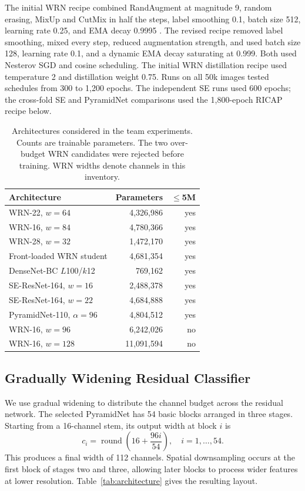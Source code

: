 \documentclass[letterpaper]{article} %
\begin{document}
The initial WRN recipe combined RandAugment at magnitude 9, random erasing, MixUp and CutMix in half the steps, label smoothing 0.1, batch size 512, learning rate 0.25, and EMA decay 0.9995 \cite{cubuk2019randaugment,zhang2018mixup,yun2019cutmix}. The revised recipe removed label smoothing, mixed every step, reduced augmentation strength, and used batch size 128, learning rate 0.1, and a dynamic EMA decay saturating at 0.999. Both used Nesterov SGD and cosine scheduling. The initial WRN distillation recipe used temperature 2 and distillation weight 0.75. Runs on all 50k images tested schedules from 300 to 1,200 epochs. The independent SE runs used 600 epochs; the cross-fold SE and PyramidNet comparisons used the 1,800-epoch RICAP recipe below.

\begin{table}[t]
\centering
\small
\begin{tabular}{lrr}
\toprule
Architecture & Parameters & $\le$5M \\
\midrule
WRN-22, $w{=}64$ & 4{,}326{,}986 & yes \\
WRN-16, $w{=}84$ & 4{,}780{,}366 & yes \\
WRN-28, $w{=}32$ & 1{,}472{,}170 & yes \\
Front-loaded WRN student & 4{,}681{,}354 & yes \\
DenseNet-BC $L$100/$k$12 & 769{,}162 & yes \\
SE-ResNet-164, $w{=}16$ & 2{,}488{,}378 & yes \\
SE-ResNet-164, $w{=}22$ & 4{,}684{,}888 & yes \\
PyramidNet-110, $\alpha{=}96$ & 4{,}804{,}512 & yes \\
\midrule
WRN-16, $w{=}96$ & 6{,}242{,}026 & no \\
WRN-16, $w{=}128$ & 11{,}091{,}594 & no \\
\bottomrule
\end{tabular}
\caption{Architectures considered in the team experiments. Counts are trainable parameters. The two over-budget WRN candidates were rejected before training. WRN widths denote channels in this inventory.}
\label{tab:budget}
\end{table}

\subsection{Gradually Widening Residual Classifier}
We use gradual widening to distribute the channel budget across the residual network. The selected PyramidNet has 54 basic blocks arranged in three stages. Starting from a 16-channel stem, its output width at block $i$ is
\begin{equation}
 c_i=\operatorname{round}\left(16+\frac{96i}{54}\right),\quad i=1,\ldots,54.
\end{equation}
This produces a final width of 112 channels. Spatial downsampling occurs at the first block of stages two and three, allowing later blocks to process wider features at lower resolution. Table~\ref{tab:architecture} gives the resulting layout.
\end{document}
